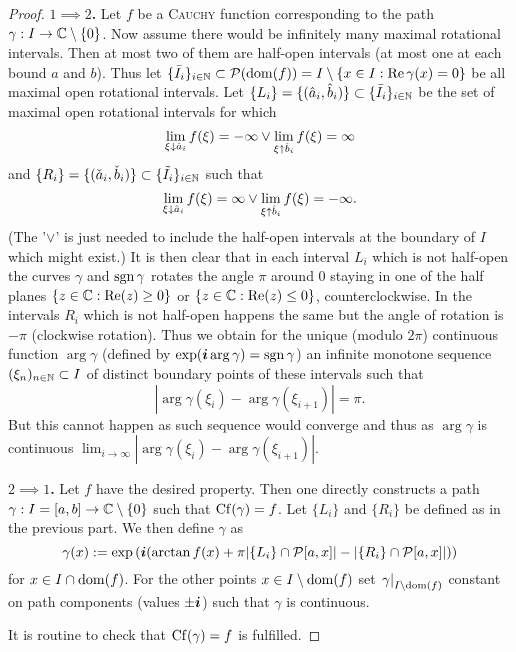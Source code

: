 \message{ !name(On The Routh-Hurwitz Theorem.tex)}\documentclass[10pt,a4paper]{article}
\begin{document}
\begin{proof}
\textbf{$1\implies 2$.}
Let $f$ be a \textsc{Cauchy} function corresponding to the path $\gamma:I\rightarrow\mathbb{C}\setminus\{0\}$.
Now assume there would be infinitely many maximal rotational intervals. Then at most two of them are half-open intervals (at most one at each bound $a$ and $b$). Thus let $\{\bar{I}_i\}_{i\in\mathbb{N}}\subset\mathcal{P}(\operatorname{dom}(f))=I\setminus\{x\in I:\operatorname{Re}{\gamma(x)}=0\}$ be all maximal open rotational intervals.
Let $\{L_i\}=\{(\hat{a}_i,\hat{b}_i)\}\subset\{\bar{I}_i\}_{i\in\mathbb{N}}$ be the set of maximal open rotational intervals for which
\begin{equation}
\lim_{\xi\downarrow \hat{a}_i}{f(\xi)}=-\infty \vee \lim_{\xi\uparrow \hat{b}_i}{f(\xi)}=\infty
\end{equation}
and $\{R_i\}=\{(\check{a}_i,\check{b}_i)\}\subset\{\tilde{I}_i\}_{i\in\mathbb{N}}$ such that
\begin{equation}
\lim_{\xi\downarrow \hat{a}_i}{f(\xi)}=\infty \vee \lim_{\xi\uparrow \hat{b}_i}{f(\xi)}=-\infty\text{.}
\end{equation}
(The '$\vee$' is just needed to include the half-open intervals at the boundary of $I$ which might exist.)
It is then clear that in each interval $L_i$ which is not half-open the curves $\gamma$ and $\operatorname{sgn}{\gamma}$ rotates the angle $\pi$ around $0$ staying in one of the half planes $\{z\in\mathbb{C}:\operatorname{Re}(z)\geq 0\}$ or $\{z\in\mathbb{C}:\operatorname{Re}(z)\leq 0\}$, counterclockwise. In the intervals $R_i$ which is not half-open happens the same but the angle of rotation is $-\pi$ (clockwise rotation). Thus we obtain for the unique (modulo $2\pi$) continuous function $\arg{\gamma}$ (defined by $\exp(\boldsymbol{i}\arg{\gamma})=\operatorname{sgn}{\gamma}$) an infinite monotone sequence $(\xi_n)_{n\in\mathbb{N}}\subset I$ of distinct boundary points of these intervals such that 
\begin{equation}
|\arg{\gamma(\xi_i)}-\arg{\gamma(\xi_{i+1})}|=\pi\text{.}
\end{equation}
But this cannot happen as such sequence would converge and thus as $\arg{\gamma}$ is continuous $\lim_{i\to\infty}{|\arg{\gamma(\xi_i)}-\arg{\gamma(\xi_{i+1})}|}$.

\textbf{$2\implies1$.} Let $f$ have the desired property. Then one directly constructs a path $\gamma:I=[a,b]\rightarrow\mathbb{C}\setminus\{0\}$ such that $\operatorname{Cf}(\gamma)=f$. Let $\{L_i\}$ and $\{R_i\}$ be defined as in the previous part.
We then define $\gamma$ as
\begin{equation}
\gamma(x):=\exp\left(\boldsymbol{i}(\arctan{f(x)}+\pi|\{L_i\}\cap\mathcal{P}{[a,x]}|-|\{R_i\}\cap\mathcal{P}{[a,x]}|)\right)
\end{equation}
for $x\in I\cap\operatorname{dom}(f)$. For the other points $x\in I\setminus\operatorname{dom}(f)$ set $\left. \gamma\right\vert_{I\setminus\operatorname{dom}(f)}$ constant on path components (values $\pm\boldsymbol{i}$) such that $\gamma$ is continuous.

It is routine to check that $\operatorname{Cf}(\gamma)=f$ is fulfilled. 
\end{proof}
\end{document}
